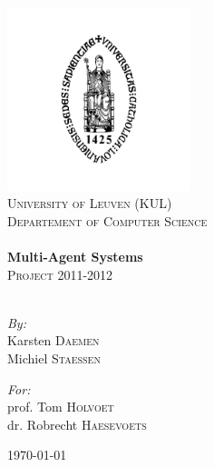 \begin{titlepage}

\begin{center}


\includegraphics[width=0.40\textwidth]{./logo.png}\\[1cm]    

\textsc{\LARGE University of Leuven (KUL)}\\[0.3cm]

\textsc{\Large Departement of Computer Science}\\[2.0cm]


\HRule \\[0.4cm]
{ \huge \bfseries Multi-Agent Systems}\\[0.2cm]
\textsc{ \Large Project 2011-2012}\\[0.4cm]
\HRule \\[2.5cm]

\begin{minipage}{0.4\textwidth}
\begin{flushleft} \large
\emph{By:}\\
Karsten \textsc{Daemen}\\
Michiel \textsc{Staessen}

\end{flushleft}
\end{minipage}
\begin{minipage}{0.5\textwidth}
\begin{flushright} \large
\emph{For:} \\
prof. Tom \textsc{Holvoet} \\
dr. Robrecht \textsc{Haesevoets}
\end{flushright}
\end{minipage}

\vfill

{\large \today}

\end{center}

\end{titlepage}